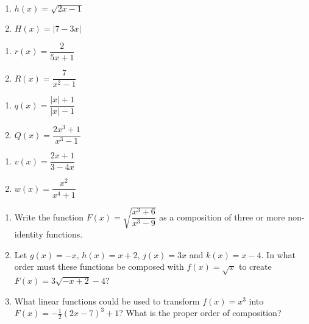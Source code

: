 \begin{multicols}{2}
\begin{enumerate}
\setcounter{enumi}{\value{HW}}

\item  $h(x) = \sqrt{2x-1}$
\item  $H(x) = |7-3x|$

\setcounter{HW}{\value{enumi}}
\end{enumerate}
\end{multicols}

\begin{multicols}{2}
\begin{enumerate}
\setcounter{enumi}{\value{HW}}

\item  $r(x) = \dfrac{2}{5x+1}$
\item  $R(x) = \dfrac{7}{x^2-1}$

\setcounter{HW}{\value{enumi}}
\end{enumerate}
\end{multicols}

\begin{multicols}{2}
\begin{enumerate}
\setcounter{enumi}{\value{HW}}

\item  $q(x) = \dfrac{|x|+1}{|x|-1}$
\item  $Q(x) = \dfrac{2x^3+1}{x^3-1}$

\setcounter{HW}{\value{enumi}}
\end{enumerate}
\end{multicols}

\begin{multicols}{2}
\begin{enumerate}
\setcounter{enumi}{\value{HW}}

\item  $v(x) = \dfrac{2x+1}{3-4x}$
\item  $w(x) = \dfrac{x^2}{x^4+1}$ \label{breakdownxomexlast}

\setcounter{HW}{\value{enumi}}
\end{enumerate}
\end{multicols}

\begin{enumerate}
\setcounter{enumi}{\value{HW}}

\item Write the function $F(x) = \sqrt{\dfrac{x^{3} + 6}{x^{3} - 9}}$ as a composition of three or more non-identity functions.

\item Let $g(x) = -x, \, h(x) = x + 2, \, j(x) = 3x$ and $k(x) = x - 4$.  In what order must these functions be composed with $f(x) = \sqrt{x}$ to create $F(x) = 3\sqrt{-x + 2} - 4$?

\item What linear functions could be used to transform $f(x) = x^{3}$ into $F(x) = -\frac{1}{2}(2x - 7)^{3} + 1$?  What is the proper order of composition?

\setcounter{HW}{\value{enumi}}
\end{enumerate}



